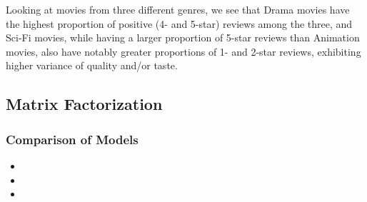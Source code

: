 \begin{itemize}
        Looking at movies from three different genres, we see that Drama movies have the highest proportion of positive (4- and 5-star) reviews among the three, and Sci-Fi movies, while having a larger proportion of 5-star reviews than Animation movies, also have notably greater proportions of 1- and 2-star reviews, exhibiting higher variance of quality and/or taste.

\end{itemize}

\subsection{Matrix Factorization}
\subsubsection{Comparison of Models}
\begin{itemize}
    \item {}
    \item {}
    \item {}
\end{itemize}

